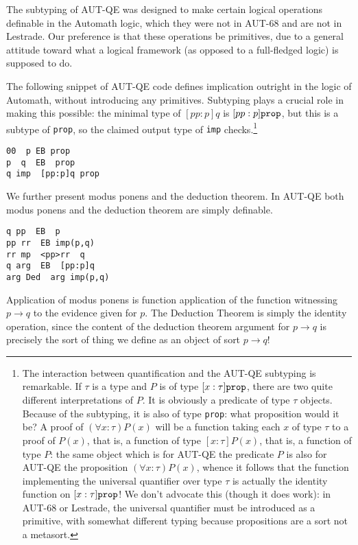 \documentclass[submission,copyright,creativecommons]{eptcs}
\begin{document}
The subtyping of AUT-QE was designed to make certain logical operations definable in the Automath logic, which they were not in AUT-68 and are not in Lestrade.
Our preference is that these operations be primitives, due to a general attitude toward what a logical framework (as opposed to a full-fledged logic) is supposed to do.

The following snippet of AUT-QE code defines implication outright in the logic of Automath, without introducing any primitives.  Subtyping plays a crucial role in making this possible:  the minimal type of $[pp:p]q$ is $[pp:p]{\tt prop}$, but this is a subtype of {\tt prop}, so the claimed output  type of {\tt imp} checks.\footnote{The interaction between quantification and the AUT-QE subtyping is remarkable.  If $\tau$ is a type and $P$ is of type $[x:\tau]{\tt prop}$, there are two quite different interpretations of $P$.  It is obviously a predicate of type $\tau$ objects.  Because of the subtyping, it is also of type {\tt prop}:  what proposition would it be?  A proof of $(\forall x:\tau)P(x)$ will be a function taking each $x$ of type $\tau$ to a proof of $P(x)$, that is, a function of type $[x:\tau]P(x)$, that is, a function of type $P$:  the same object which is for AUT-QE the predicate $P$ is also for AUT-QE the proposition $(\forall x:\tau)P(x)$, whence it follows that the function implementing the universal quantifier over type $\tau$ is actually the identity function on $[x:\tau]{\tt prop}$!  We don't advocate this (though it does work):  in AUT-68 or Lestrade, the universal quantifier must be introduced as a primitive, with somewhat different typing because propositions are a sort not a metasort.}

   \begin{verbatim}
00  p EB prop
p  q  EB  prop
q imp  [pp:p]q prop
\end{verbatim}



We further present modus ponens and the deduction theorem. In AUT-QE
both modus ponens and the deduction theorem are simply definable.

   \begin{verbatim}
q pp  EB  p
pp rr  EB imp(p,q)
rr mp  <pp>rr  q
q arg  EB  [pp:p]q
arg Ded  arg imp(p,q)
\end{verbatim}

Application of modus ponens is function application of the function witnessing $p \rightarrow q$ to the evidence given for $p$.  The Deduction Theorem is simply the identity operation, since the content of the deduction theorem argument for $p \rightarrow q$ is precisely the sort of thing we define as an object of sort $p \rightarrow q$!
\end{document}
